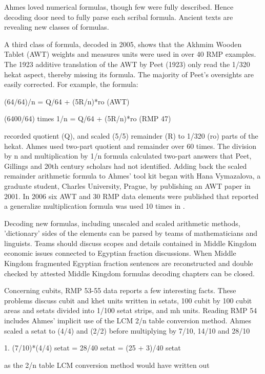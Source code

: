 \documentclass[12pt]{article}
\begin{document}
Ahmes loved numerical formulas, though few were fully described. Hence decoding door need to fully parse each scribal formula. Ancient texts are revealing new classes of formulas.

A third class of formula, decoded in 2005, shows that the Akhmim Wooden Tablet (AWT) weights and measures units were used in over 40 RMP examples. The 1923 additive translation of the AWT by Peet (1923) only read the 1/320 hekat aspect, thereby missing its formula. The majority of Peet's oversights are easily corrected. For example, the formula:

(64/64)/n = Q/64 + (5R/n)*ro (AWT)

(6400/64) times 1/n = Q/64 + (5R/n)*ro (RMP 47)

recorded quotient (Q), and scaled (5/5) remainder (R) to 1/320 (ro) parts of the hekat. Ahmes used two-part quotient and remainder over 60 times. The division by n and multiplication by 1/n formula calculated two-part answers that Peet, Gillings and 20th century scholars had not identified. Adding back the scaled remainder arithmetic formula to Ahmes' tool kit began with Hana Vymazalova, a graduate student, Charles University, Prague, by publishing an AWT paper in 2001. In 2006 six AWT and 30 RMP data elements were published that reported a generalize multiplication formula was used 10 times in .

Decoding new formulas, including unscaled and scaled arithmetic methods, 'dictionary' sides of the elements can be parsed by teams of mathematicians and linguists. Teams should discuss scopes and details contained in Middle Kingdom economic issues connected to Egyptian fraction discussions. When Middle Kingdom fragmented Egyptian fraction sentences are reconstructed and double checked by attested Middle Kingdom formulas decoding chapters can be closed. 

Concerning cubits, RMP 53-55 data reports a few interesting facts. These problems discuss cubit and khet units written in setats, 100 cubit by 100 cubit areas and setats divided into 1/100 setat strips, and mh units. Reading RMP 54 includes Ahmes' implicit use of the LCM 2/n table conversion method. Ahmes scaled a setat to (4/4) and (2/2) before multiplying by 7/10, 14/10 and 28/10

1. (7/10)*(4/4) setat = 28/40 setat = (25 + 3)/40 setat

as the 2/n table LCM conversion method would have written out
\end{document}
